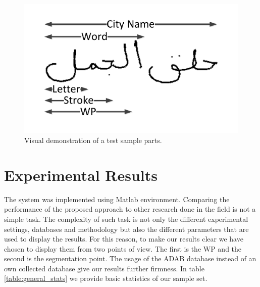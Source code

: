 \documentclass[10pt, conference, compsocconf]{IEEEtran}
\begin{document}
\begin{figure}
\centering
\includegraphics[width=0.6\columnwidth]{./figures/sample_parts}
\caption{Visual demonstration of a test sample parts.}
\label{fig:sample_parts}
\end{figure}

\section{Experimental Results}
\label{sec:results}
The system was implemented using Matlab environment. Comparing the performance of the proposed approach to other research done in the field is not a simple task. The complexity of such task is not only the different experimental settings, databases and methodology but also the different parameters that are used to display the results. For this reason, to make our results clear we have chosen to display them from two points of view. The first is the WP and the second is the segmentation point. The usage of the ADAB database instead of an own collected database give our results further firmness. In table \ref{table:general_stats} we provide basic statistics of our sample set.\\
\end{document}
